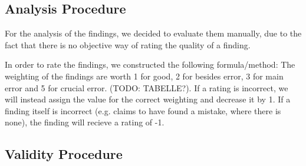 \subsection{Analysis Procedure}

For the analysis of the findings, we decided to evaluate them manually, due to the fact that there is no objective way of rating the quality of a finding.

In order to rate the findings, we constructed the following formula/method:
The weighting of the findings are worth 1 for good, 2 for besides error, 3 for main error and 5 for crucial error. (TODO: TABELLE?). If a rating is incorrect, we will instead assign the value for the correct weighting and decrease it by 1.
If a finding itself is incorrect (e.g. claims to have found a mistake, where there is none), the finding will recieve a rating of -1.

\subsection{Validity Procedure}